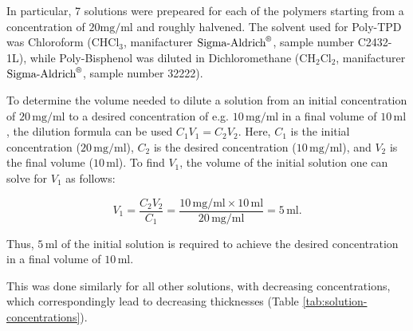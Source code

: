 In particular, 7 solutions were prepeared for each of the polymers starting from a concentration of $20 \text{mg/ml}$
and roughly halvened.
The solvent used for Poly-TPD was Chloroform ($\text{CHCl}_3$, manifacturer $\text{Sigma-Aldrich}^{\text{\textregistered}}$, sample number C2432-1L), while Poly-Bisphenol was diluted in Dichloromethane ($\text{CH}_2\text{Cl}_2$, manifacturer $\text{Sigma-Aldrich}^{\text{\textregistered}}$, sample number 32222).


To determine the volume needed to dilute a solution from an initial concentration of \(20 \, \text{mg/ml}\) to a desired concentration of e.g. \(10 \, \text{mg/ml}\) in a final volume of \(10 \, \text{ml}\), the dilution formula can be used \(C_1 V_1 = C_2 V_2\). Here, \(C_1\) is the initial concentration (\(20 \, \text{mg/ml}\)), \(C_2\) is the desired concentration (\(10 \, \text{mg/ml}\)), and \(V_2\) is the final volume (\(10 \, \text{ml}\)). To find \(V_1\), the volume of the initial solution one can solve for \(V_1\) as follows:

\[
V_1 = \frac{C_2 V_2}{C_1} = \frac{10 \, \text{mg/ml} \times 10 \, \text{ml}}{20 \, \text{mg/ml}} = 5 \, \text{ml}.
\]

Thus, \(5 \, \text{ml}\) of the initial solution is required to achieve the desired concentration in a final volume of \(10 \, \text{ml}\).

This was done similarly for all other solutions, with decreasing concentrations, which correspondingly lead to decreasing thicknesses (Table \ref{tab:solution-concentrations}).

